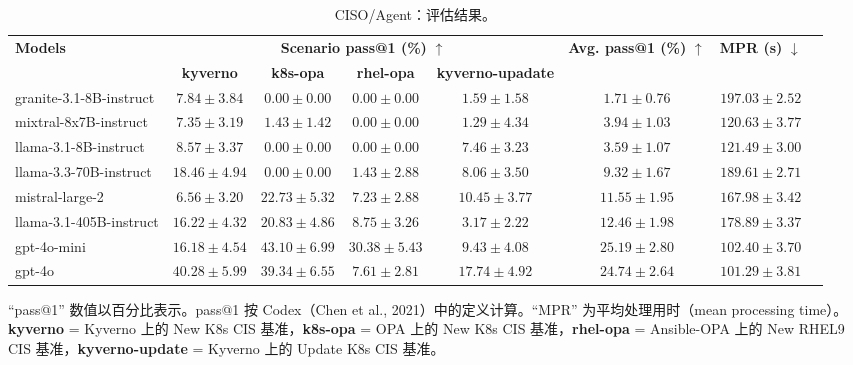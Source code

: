 \begin{table}[H]
\centering
\caption{CISO/Agent：评估结果。}
\label{tab:itbench-24}
\begin{adjustbox}{max width=\linewidth}
\begin{tabular}{lccccccc}
\toprule
\multirow{2}{*}{\textbf{Models}} & \multicolumn{4}{c}{\textbf{Scenario pass@1 (\%)} $\uparrow$} & \multirow{2}{*}{\textbf{Avg. pass@1 (\%)} $\uparrow$} & \multirow{2}{*}{\textbf{MPR (s)} $\downarrow$} \\
\cmidrule(lr){2-5}
 & \textbf{kyverno} & \textbf{k8s-opa} & \textbf{rhel-opa} & \textbf{kyverno-upadate} & & \\
\midrule
granite-3.1-8B-instruct  & $7.84 \pm 3.84$  & $0.00 \pm 0.00$  & $0.00 \pm 0.00$  & $1.59 \pm 1.58$  & $1.71 \pm 0.76$  & $197.03 \pm 2.52$ \\
mixtral-8x7B-instruct    & $7.35 \pm 3.19$  & $1.43 \pm 1.42$  & $0.00 \pm 0.00$  & $1.29 \pm 4.34$  & $3.94 \pm 1.03$  & $120.63 \pm 3.77$ \\
llama-3.1-8B-instruct    & $8.57 \pm 3.37$  & $0.00 \pm 0.00$  & $0.00 \pm 0.00$  & $7.46 \pm 3.23$  & $3.59 \pm 1.07$  & $121.49 \pm 3.00$ \\
llama-3.3-70B-instruct   & $18.46 \pm 4.94$ & $0.00 \pm 0.00$  & $1.43 \pm 2.88$  & $8.06 \pm 3.50$  & $9.32 \pm 1.67$  & $189.61 \pm 2.71$ \\
mistral-large-2          & $6.56 \pm 3.20$  & $22.73 \pm 5.32$ & $7.23 \pm 2.88$  & $10.45 \pm 3.77$ & $11.55 \pm 1.95$ & $167.98 \pm 3.42$ \\
llama-3.1-405B-instruct  & $16.22 \pm 4.32$ & $20.83 \pm 4.86$ & $8.75 \pm 3.26$  & $3.17 \pm 2.22$  & $12.46 \pm 1.98$ & $178.89 \pm 3.37$ \\
gpt-4o-mini              & $16.18 \pm 4.54$ & $43.10 \pm 6.99$ & $30.38 \pm 5.43$ & $9.43 \pm 4.08$  & $25.19 \pm 2.80$ & $102.40 \pm 3.70$ \\
gpt-4o                   & $40.28 \pm 5.99$ & $39.34 \pm 6.55$ & $7.61 \pm 2.81$  & $17.74 \pm 4.92$ & $24.74 \pm 2.64$ & $101.29 \pm 3.81$ \\
\bottomrule
\end{tabular}
\end{adjustbox}
\par\smallskip
\footnotesize\raggedright
``pass@1'' 数值以百分比表示。pass@1 按 Codex（Chen et al., 2021）中的定义计算。``MPR'' 为平均处理用时（mean processing time）。\\
\textbf{kyverno} = Kyverno 上的 New K8s CIS 基准，\textbf{k8s-opa} = OPA 上的 New K8s CIS 基准，\textbf{rhel-opa} = Ansible-OPA 上的 New RHEL9 CIS 基准，\textbf{kyverno-update} = Kyverno 上的 Update K8s CIS 基准。
\end{table}
